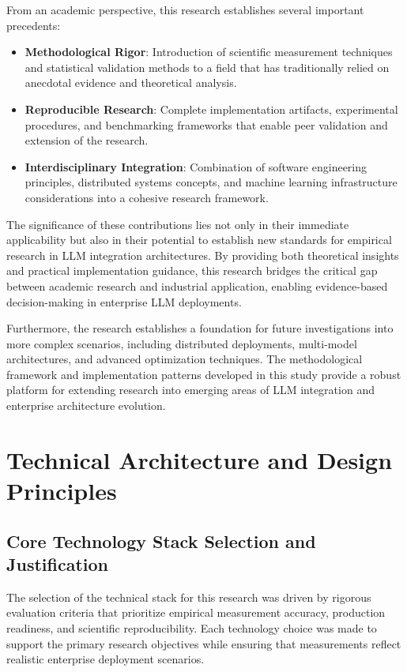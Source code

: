 From an academic perspective, this research establishes several important precedents:

\begin{itemize}
    \item \textbf{Methodological Rigor}: Introduction of scientific measurement techniques and statistical validation methods to a field that has traditionally relied on anecdotal evidence and theoretical analysis.
    \item \textbf{Reproducible Research}: Complete implementation artifacts, experimental procedures, and benchmarking frameworks that enable peer validation and extension of the research.
    \item \textbf{Interdisciplinary Integration}: Combination of software engineering principles, distributed systems concepts, and machine learning infrastructure considerations into a cohesive research framework.
\end{itemize}

The significance of these contributions lies not only in their immediate applicability but also in their potential to establish new standards for empirical research in LLM integration architectures. By providing both theoretical insights and practical implementation guidance, this research bridges the critical gap between academic research and industrial application, enabling evidence-based decision-making in enterprise LLM deployments.

Furthermore, the research establishes a foundation for future investigations into more complex scenarios, including distributed deployments, multi-model architectures, and advanced optimization techniques. The methodological framework and implementation patterns developed in this study provide a robust platform for extending research into emerging areas of LLM integration and enterprise architecture evolution.

\chapter{Technical Architecture and Design Principles}

\section{Core Technology Stack Selection and Justification}

The selection of the technical stack for this research was driven by rigorous evaluation criteria that prioritize empirical measurement accuracy, production readiness, and scientific reproducibility. Each technology choice was made to support the primary research objectives while ensuring that measurements reflect realistic enterprise deployment scenarios.

